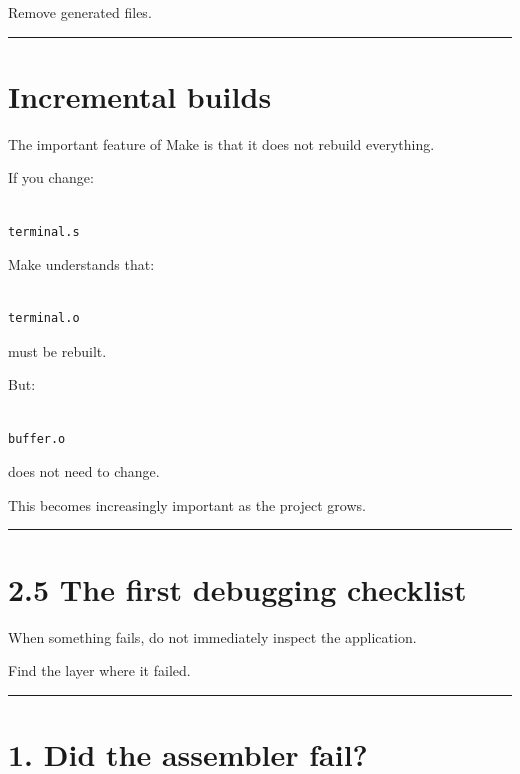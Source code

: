 \documentclass[
  oneside,
  openany]{book}
\begin{document}
Remove generated files.

\begin{center}\rule{0.5\linewidth}{0.5pt}\end{center}

\hypertarget{incremental-builds}{%
\section{Incremental builds}\label{incremental-builds}}

The important feature of Make is that it does not rebuild everything.

If you change:

\begin{verbatim}

terminal.s
\end{verbatim}

Make understands that:

\begin{verbatim}

terminal.o
\end{verbatim}

must be rebuilt.

But:

\begin{verbatim}

buffer.o
\end{verbatim}

does not need to change.

This becomes increasingly important as the project grows.

\begin{center}\rule{0.5\linewidth}{0.5pt}\end{center}

\hypertarget{the-first-debugging-checklist}{%
\section{2.5 The first debugging
checklist}\label{the-first-debugging-checklist}}

When something fails, do not immediately inspect the application.

Find the layer where it failed.

\begin{center}\rule{0.5\linewidth}{0.5pt}\end{center}

\hypertarget{did-the-assembler-fail}{%
\section{1. Did the assembler fail?}\label{did-the-assembler-fail}}
\end{document}
